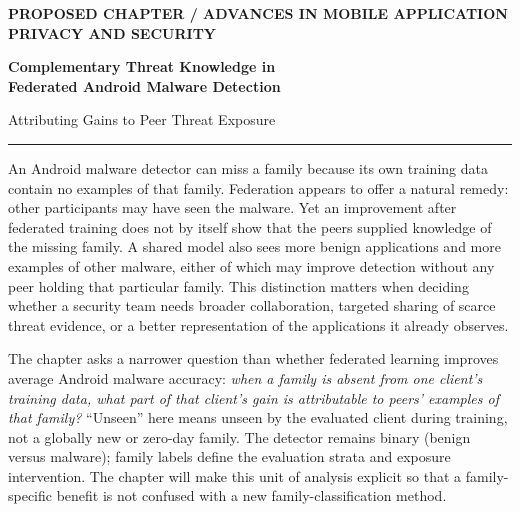 \documentclass[11pt,a4paper]{article}
\begin{document}
\thispagestyle{empty}
{\footnotesize\bfseries\color{accent} PROPOSED CHAPTER \quad / \quad ADVANCES IN MOBILE APPLICATION PRIVACY AND SECURITY}\par
\vspace{0.75em}
{\LARGE\bfseries\color{ink} Complementary Threat Knowledge in\\ Federated Android Malware Detection\par}
\vspace{0.35em}
{\normalsize\color{accent} Attributing Gains to Peer Threat Exposure}\par
\vspace{0.9em}\hrule\vspace{0.8em}

An Android malware detector can miss a family because its own training data contain no examples of that family. Federation appears to offer a natural remedy: other participants may have seen the malware. Yet an improvement after federated training does not by itself show that the peers supplied knowledge of the missing family. A shared model also sees more benign applications and more examples of other malware, either of which may improve detection without any peer holding that particular family. This distinction matters when deciding whether a security team needs broader collaboration, targeted sharing of scarce threat evidence, or a better representation of the applications it already observes.

The chapter asks a narrower question than whether federated learning improves average Android malware accuracy: \emph{when a family is absent from one client's training data, what part of that client's gain is attributable to peers' examples of that family?} ``Unseen'' here means unseen by the evaluated client during training, not a globally new or zero-day family. The detector remains binary (benign versus malware); family labels define the evaluation strata and exposure intervention. The chapter will make this unit of analysis explicit so that a family-specific benefit is not confused with a new family-classification method.
\end{document}
